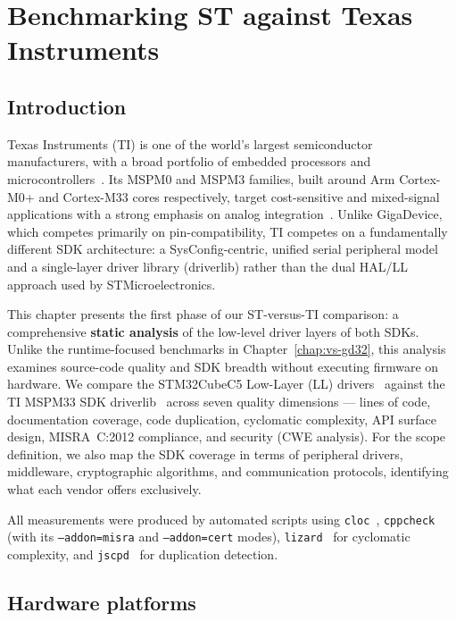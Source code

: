 \chapter{Benchmarking ST against Texas Instruments}
\label{chap:vs-ti}

\section*{Introduction}

Texas Instruments (TI) is one of the world's largest semiconductor manufacturers, with a
broad portfolio of embedded processors and microcontrollers~\cite{ti-about}. Its MSPM0 and
MSPM3 families, built around Arm Cortex-M0+ and Cortex-M33 cores respectively, target
cost-sensitive and mixed-signal applications with a strong emphasis on analog
integration~\cite{ti-mspm33-product}. Unlike GigaDevice, which competes primarily on
pin-compatibility, TI competes on a fundamentally different SDK architecture: a
SysConfig-centric, unified serial peripheral model and a single-layer driver library
(driverlib) rather than the dual HAL/LL approach used by STMicroelectronics.

This chapter presents the first phase of our ST-versus-TI comparison: a comprehensive
\textbf{static analysis} of the low-level driver layers of both SDKs. Unlike the
runtime-focused benchmarks in Chapter~\ref{chap:vs-gd32}, this analysis examines source-code
quality and SDK breadth without executing firmware on hardware. We compare the
STM32CubeC5 Low-Layer (LL) drivers~\cite{stm32cubec5-sw} against the TI MSPM33 SDK
driverlib~\cite{ti-mspm33-sdk} across seven quality dimensions --- lines of code,
documentation coverage, code duplication, cyclomatic complexity, API surface design,
MISRA~C:2012 compliance, and security (CWE analysis). For the scope definition, we also
map the SDK coverage in terms of peripheral drivers, middleware, cryptographic algorithms,
and communication protocols, identifying what each vendor offers exclusively.

All measurements were produced by automated scripts using
\texttt{cloc}~\cite{cloc-tool}, \texttt{cppcheck}~\cite{cppcheck-tool} (with its
\texttt{--addon=misra} and \texttt{--addon=cert} modes),
\texttt{lizard}~\cite{lizard-tool} for cyclomatic complexity, and
\texttt{jscpd}~\cite{jscpd-tool} for duplication detection.

\section{Hardware platforms}
\label{sec:ti-boards}

